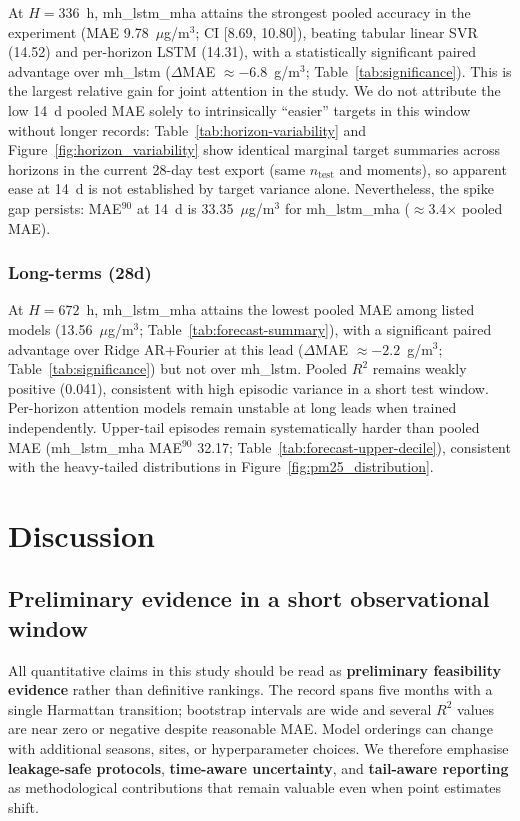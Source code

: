 \documentclass[a4paper,fleqn]{cas-sc}
\begin{document}
At $H=336$~h, mh\_lstm\_mha attains the strongest pooled accuracy in the experiment (MAE 9.78~$\mu$g/m$^3$; CI [8.69, 10.80]), beating tabular linear SVR (14.52) and per-horizon LSTM (14.31), with a statistically significant paired advantage over mh\_lstm ($\Delta$MAE $\approx -6.8$~\textmu g/m$^3$; Table~\ref{tab:significance}). This is the largest relative gain for joint attention in the study. We do not attribute the low 14~d pooled MAE solely to intrinsically ``easier'' targets in this window without longer records: Table~\ref{tab:horizon-variability} and Figure~\ref{fig:horizon_variability} show identical marginal target summaries across horizons in the current 28-day test export (same $n_{\mathrm{test}}$ and moments), so apparent ease at 14~d is not established by target variance alone. Nevertheless, the spike gap persists: MAE$^{90}$ at 14~d is 33.35~$\mu$g/m$^3$ for mh\_lstm\_mha ($\approx$3.4$\times$ pooled MAE).

\subsubsection{Long-terms (28d)}\label{sec:res672}
At $H=672$~h, mh\_lstm\_mha attains the lowest pooled MAE among listed models (13.56~$\mu$g/m$^3$; Table~\ref{tab:forecast-summary}), with a significant paired advantage over Ridge AR+Fourier at this lead ($\Delta$MAE $\approx -2.2$~\textmu g/m$^3$; Table~\ref{tab:significance}) but not over mh\_lstm. Pooled $R^2$ remains weakly positive (0.041), consistent with high episodic variance in a short test window. Per-horizon attention models remain unstable at long leads when trained independently. Upper-tail episodes remain systematically harder than pooled MAE (mh\_lstm\_mha MAE$^{90}$ 32.17; Table~\ref{tab:forecast-upper-decile}), consistent with the heavy-tailed distributions in Figure~\ref{fig:pm25_distribution}.

\section{Discussion}\label{sec4}

\subsection{Preliminary evidence in a short observational window}

All quantitative claims in this study should be read as \textbf{preliminary feasibility evidence} rather than definitive rankings. The record spans five months with a single Harmattan transition; bootstrap intervals are wide and several $R^2$ values are near zero or negative despite reasonable MAE. Model orderings can change with additional seasons, sites, or hyperparameter choices. We therefore emphasise \textbf{leakage-safe protocols}, \textbf{time-aware uncertainty}, and \textbf{tail-aware reporting} as methodological contributions that remain valuable even when point estimates shift.
\end{document}
